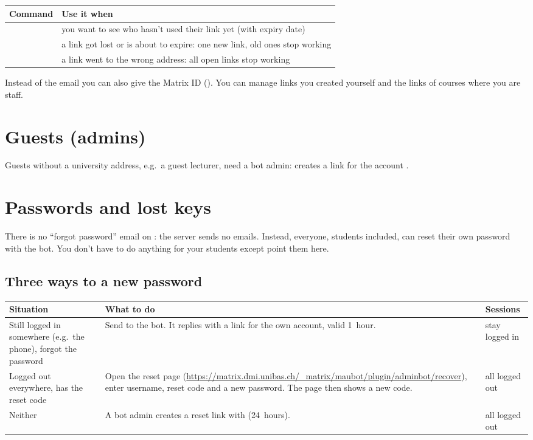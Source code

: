 \begin{center}
\begin{tabularx}{\textwidth}{@{}lL@{}}
\toprule
\textbf{Command} & \textbf{Use it when} \\
\midrule
{} & you want to see who hasn't used their link yet (with expiry date) \\
 & a link got lost or is about to expire: one new link, old ones stop working \\
 & a link went to the wrong address: all open links stop working \\
\bottomrule
\end{tabularx}
\end{center}

Instead of the email you can also give the Matrix ID ().
You can manage links you created yourself and the links of courses where you are staff.

\section{Guests (admins)}
\label{sec:guests}

Guests without a university address, e.g.\ a guest lecturer, need a bot admin:
 creates a link for the account
.

\section{Passwords and lost keys}
\label{sec:passwords}

There is no \enquote{forgot password} email on \server: the server sends no emails. Instead,
everyone, students included, can reset their own password with the bot. You don't have to do
anything for your students except point them here.

\subsection{Three ways to a new password}

\begin{center}
\begin{tabularx}{\textwidth}{@{}lLL@{}}
\toprule
\textbf{Situation} & \textbf{What to do} & \textbf{Sessions} \\
\midrule
Still logged in somewhere (e.g.\ the phone), forgot the password &
  Send  to the bot. It replies with a link for the own account, valid
  1~hour. & stay logged in \\
Logged out everywhere, has the reset code &
  Open the reset page (\url{https://matrix.dmi.unibas.ch/_matrix/maubot/plugin/adminbot/recover}),
  enter username, reset code and a new password. The page then shows a new code. &
  all logged out \\
Neither &
  A bot admin creates a reset link with  (24~hours). &
  all logged out \\
\bottomrule
\end{tabularx}
\end{center}

